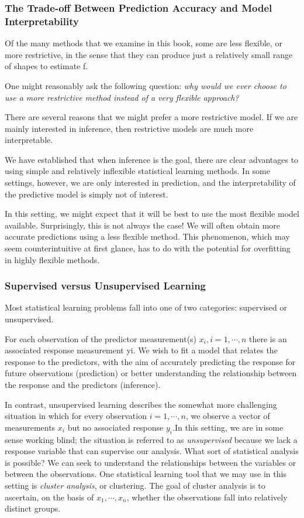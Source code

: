 \documentclass{article}
\theoremstyle{definition}
\theoremstyle{remark}
\begin{document}
\subsubsection*{The Trade-off Between Prediction Accuracy and Model Interpretability}
	Of the many methods that we examine in this book, some are less flexible, or more restrictive, in the sense that they can produce just a relatively small range of shapes to estimate f.
	
	One might reasonably ask the following question: \textit{why would we ever choose to use a more restrictive method instead of a very flexible approach?}
	
	There are several reasons that we might prefer a more restrictive model. If we are mainly interested in inference, then restrictive models are much more interpretable.
	
	We have established that when inference is the goal, there are clear advantages to using simple and relatively inflexible statistical learning methods. In some settings, however, we are only interested in prediction, and the interpretability of the predictive model is simply not of interest.
	
	In this setting, we might expect that it will be best to use the most flexible model available. Surprisingly, this is not always the case! We will often obtain more accurate predictions using a less flexible method. This phenomenon, which may seem counterintuitive at first glance, has to do with the potential for overfitting in highly flexible methods.
	
\subsubsection*{Supervised versus Unsupervised Learning}

Most statistical learning problems fall into one of two categories: supervised or unsupervised.

For each observation of the predictor measurement(s) $x_i, i=1,\cdots, n$ there is an associated response
measurement yi. We wish to fit a model that relates the response to the
predictors, with the aim of accurately predicting the response for future
observations (prediction) or better understanding the relationship between
the response and the predictors (inference).

In contrast, unsupervised learning describes the somewhat more challenging situation in which for every observation $i=1, \cdots, n$, we observe a vector of measurements $x_i$ but no associated response $y_i$.In this setting, we are in some sense working blind; the situation is referred to as \textit{unsupervised} because we lack a response variable that can supervise our analysis. What sort of statistical analysis is possible? We can seek to understand the relationships between the variables or between the observations. One statistical learning tool that we may use in this setting is \textit{cluster analysis}, or clustering. The goal of cluster analysis is to ascertain, on the basis of $x_1 ,\cdots ,x_n$, whether the observations fall into relatively distinct groups. 
\end{document}
